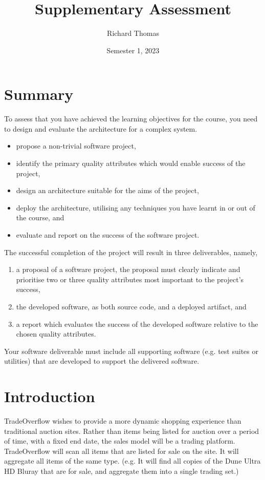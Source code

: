 \documentclass{csse4400}
\title{Supplementary Assessment}
\author{Richard Thomas}
\date{Semester 1, 2023}
\begin{document}
\maketitle

\section*{Summary}
To assess that you have achieved the learning objectives for the course,
you need to design and evaluate the architecture for a complex system.
\begin{itemize}
    \item propose a non-trivial software project,
    \item identify the primary quality attributes which would enable success of the project,
    \item design an architecture suitable for the aims of the project,
    \item deploy the architecture, utilising any techniques you have learnt in or out of the course, and
    \item evaluate and report on the success of the software project.
\end{itemize}

\noindent
The successful completion of the project will result in three deliverables, namely,
\begin{enumerate}[label=\roman*]
    \item a proposal of a software project, the proposal must clearly indicate and prioritise two or three quality attributes most important to the project's success,
    \item the developed software, as both source code, and a deployed artifact, and
    \item a report which evaluates the success of the developed software relative to the chosen quality attributes.
\end{enumerate}

\noindent
Your software deliverable must include all supporting software (e.g. test suites or utilities) that are developed to support the delivered software.

\section{Introduction}
TradeOverflow wishes to provide a more dynamic shopping experience than traditional auction sites.
Rather than items being listed for auction over a period of time, with a fixed end date,
the sales model will be a trading platform.
TradeOverflow will scan all items that are listed for sale on the site.
It will aggregate all items of the same type.
(e.g. It will find all copies of the Dune Ultra HD Bluray that are for sale, and aggregate them into a single trading set.)
\end{document}
